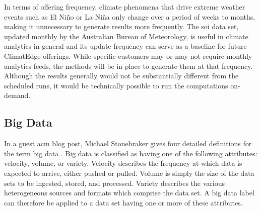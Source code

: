 In terms of offering frequency, climate phenomena that drive extreme weather events such as El Niño or La Niña only change over a period of weeks to months, making it unnecessary to generate results more frequently. The \gls{soi} data set, updated monthly by the Australian Bureau of Meteorology, is useful in climate analytics in general and its update frequency can serve as a baseline for future ClimatEdge offerings. While specific customers may or may not require monthly analytics feeds, the methods will be in place to generate them at that frequency. Although the results generally would not be substantially different from the scheduled runs, it would be technically possible to run the computations on-demand.
\subsection{Big Data}
In a guest \gls{acm} blog post, Michael Stonebraker gives four detailed definitions for the term big data \cite{stonebraker}. Big data is classified as having one of the following attributes: velocity, volume, or variety. Velocity describes the frequency at which data is expected to arrive, either pushed or pulled. Volume is simply the size of the data sets to be ingested, stored, and processed. Variety describes the various heterogeneous sources and formats which comprise the data set. A big data label can therefore be applied to a data set having  one or more of these attributes.\\

